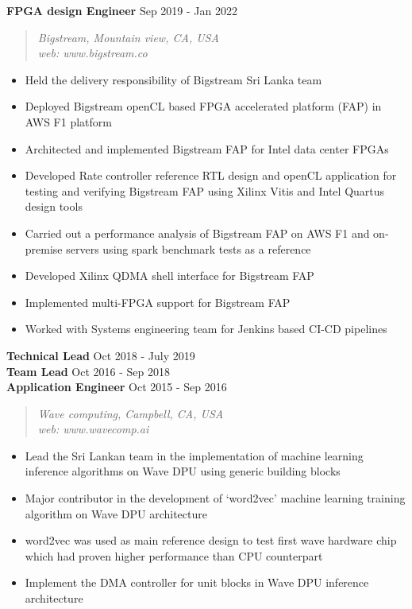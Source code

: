 \documentclass[mm]{res} %
\begin{document}
\begin{resume}
\begin{itemize}
\end{itemize}
\textbf{FPGA design Engineer} \hfill Sep 2019 - Jan 2022
\begin{quote}
	\emph{Bigstream, Mountain view, CA, USA\\
		  web: www.bigstream.co}
\end{quote}
\begin{itemize} \itemsep -1pt 
	\item Held the delivery responsibility of Bigstream Sri Lanka team
	\item Deployed Bigstream openCL based FPGA accelerated platform (FAP) in AWS F1 platform
	\item Architected and implemented Bigstream FAP for Intel data center FPGAs
	\item Developed Rate controller reference RTL design and openCL application for testing and verifying Bigstream FAP using Xilinx Vitis and Intel Quartus design tools
	\item Carried out a performance analysis of Bigstream FAP on AWS F1 and on-premise servers using spark benchmark tests as a reference
	\item Developed Xilinx QDMA shell interface for Bigstream FAP
	\item Implemented multi-FPGA support for Bigstream FAP
	\item Worked with Systems engineering team for Jenkins based CI-CD pipelines
\end{itemize}
\textbf{Technical Lead} \hfill Oct 2018 - July 2019\\
\textbf{Team Lead} \hfill Oct 2016 - Sep 2018\\
\textbf{Application Engineer} \hfill Oct 2015 - Sep 2016
\begin{quote}
	\emph{Wave computing, Campbell, CA, USA\\
		  web: www.wavecomp.ai}
\end{quote}
\begin{itemize} \itemsep -1pt 
	\item Lead the Sri Lankan team in the implementation of machine learning inference algorithms on Wave DPU using generic building blocks
	\item Major contributor in the development of `word2vec' machine learning training algorithm on Wave DPU architecture
	\item word2vec was used as main reference design to test first wave hardware chip which had proven higher performance than CPU counterpart
	\item Implement the DMA controller for unit blocks in Wave DPU inference architecture

\end{itemize}
\end{resume}
\end{document}
